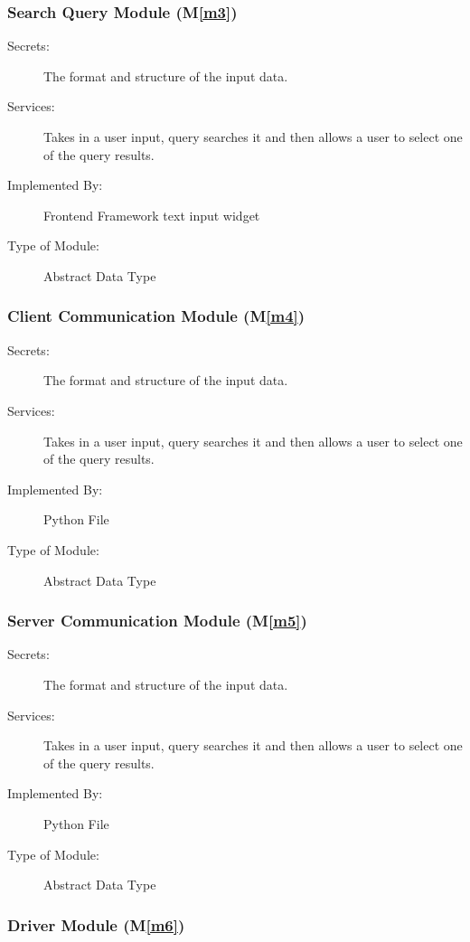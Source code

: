 \documentclass[12pt, titlepage]{article}
\newcommand{\mref}[1]{M\ref{#1}}
\begin{document}
\subsubsection{Search Query Module (\mref{m3})}

\begin{description}
\item[Secrets:] The format and structure of the input data.
\item[Services:] Takes in a user input, query searches it and then allows a user to select one of the query results. 
\item[Implemented By:] Frontend Framework text input widget
\item[Type of Module:] Abstract Data Type
\end{description}

\subsubsection{Client Communication Module (\mref{m4})}

\begin{description}
\item[Secrets:] The format and structure of the input data.
\item[Services:] Takes in a user input, query searches it and then allows a user to select one of the query results. 
\item[Implemented By:] Python File
\item[Type of Module:] Abstract Data Type
\end{description}

\subsubsection{Server Communication Module (\mref{m5})}

\begin{description}
\item[Secrets:] The format and structure of the input data.
\item[Services:] Takes in a user input, query searches it and then allows a user to select one of the query results. 
\item[Implemented By:] Python File
\item[Type of Module:] Abstract Data Type
\end{description}

\subsubsection{Driver Module (\mref{m6})}
\end{document}
